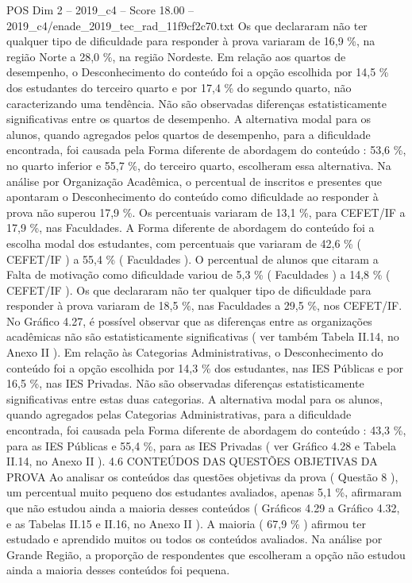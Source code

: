 \begin{textsample}{POS Dim 2 – 2019\_c4 – Score 18.00 – 2019\_c4/enade\_2019\_tec\_rad\_11f9cf2c70.txt}
Os que declararam não ter qualquer tipo de dificuldade para responder à prova variaram de 16,9 \%, na região Norte a 28,0 \%, na região Nordeste.
Em relação aos quartos de desempenho, o Desconhecimento do conteúdo foi a opção escolhida por 14,5 \% dos estudantes do terceiro quarto e por 17,4 \% do segundo quarto, não caracterizando uma tendência.
Não são observadas diferenças estatisticamente significativas entre os quartos de desempenho.
A alternativa modal para os alunos, quando agregados pelos quartos de desempenho, para a dificuldade encontrada, foi causada pela Forma diferente de abordagem do conteúdo : 53,6 \%, no quarto inferior e 55,7 \%, do terceiro quarto, escolheram essa alternativa.
Na análise por Organização Acadêmica, o percentual de inscritos e presentes que apontaram o Desconhecimento do conteúdo como dificuldade ao responder à prova não superou 17,9 \%.
Os percentuais variaram de 13,1 \%, para CEFET/IF a 17,9 \%, nas Faculdades.
A Forma diferente de abordagem do conteúdo foi a escolha modal dos estudantes, com percentuais que variaram de 42,6 \% ( CEFET/IF ) a 55,4 \% ( Faculdades ).
O percentual de alunos que citaram a Falta de motivação como dificuldade variou de 5,3 \% ( Faculdades ) a 14,8 \% ( CEFET/IF ).
Os que declararam não ter qualquer tipo de dificuldade para responder à prova variaram de 18,5 \%, nas Faculdades a 29,5 \%, nos CEFET/IF.
No Gráfico 4.27, é possível observar que as diferenças entre as organizações acadêmicas não são estatisticamente significativas ( ver também Tabela II.14, no Anexo II ).
Em relação às Categorias Administrativas, o Desconhecimento do conteúdo foi a opção escolhida por 14,3 \% dos estudantes, nas IES Públicas e por 16,5 \%, nas IES Privadas.
Não são observadas diferenças estatisticamente significativas entre estas duas categorias.
A alternativa modal para os alunos, quando agregados pelas Categorias Administrativas, para a dificuldade encontrada, foi causada pela Forma diferente de abordagem do conteúdo : 43,3 \%, para as IES Públicas e 55,4 \%, para as IES Privadas ( ver Gráfico 4.28 e Tabela II.14, no Anexo II ). 4.6 CONTEÚDOS DAS QUESTÕES OBJETIVAS DA PROVA Ao analisar os conteúdos das questões objetivas da prova ( Questão 8 ), um percentual muito pequeno dos estudantes avaliados, apenas 5,1 \%, afirmaram que não estudou ainda a maioria desses conteúdos ( Gráficos 4.29 a Gráfico 4.32, e as Tabelas II.15 e II.16, no Anexo II ).
A maioria ( 67,9 \% ) afirmou ter estudado e aprendido muitos ou todos os conteúdos avaliados.
Na análise por Grande Região, a proporção de respondentes que escolheram a opção não estudou ainda a maioria desses conteúdos foi pequena.

\end{textsample}
